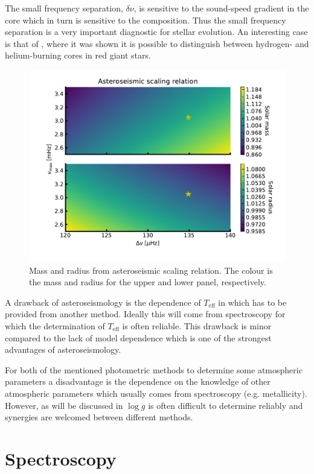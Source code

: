 The small frequency separation, $\delta\nu$, is sensitive to the sound-speed gradient in the core
which in turn is sensitive to the composition. Thus the small frequency separation is a very
important diagnostic for stellar evolution. An interesting case is that of \citet{Bedding2011},
where it was shown it is possible to distinguish between hydrogen- and helium-burning cores in red
giant stars.

\begin{figure}[htpb!]
    \centering
    \includegraphics[width=0.85\linewidth]{figures/scaling_relation.pdf}
    \caption{Mass and radius from asteroseismic scaling relation. The colour is the mass and radius
             for the upper and lower panel, respectively.}
    \label{fig:scaling}
\end{figure}

A drawback of asteroseismology is the dependence of $T_\mathrm{eff}$ in  which has
to be provided from another method. Ideally this will come from spectroscopy for which the
determination of $T_\mathrm{eff}$ is often reliable. This drawback is minor compared to the lack of
model dependence which is one of the strongest advantages of asteroseismology.

For both of the mentioned photometric methods to determine some atmospheric parameters a
disadvantage is the dependence on the knowledge of other atmospheric parameters which usually comes
from spectroscopy (e.g. metallicity). However, as will be discussed in
 $\log g$ is often difficult to determine reliably and synergies are
welcomed between different methods.

\section{Spectroscopy}
\label{sec:method_spectroscopy}


